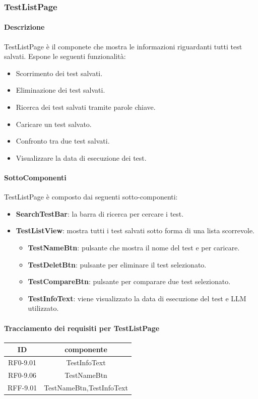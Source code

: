 \subsubsection{TestListPage}
\label{sec:TestListPage}
\paragraph{Descrizione}
TestListPage è il componete che mostra le informazioni riguardanti tutti test salvati. Espone le seguenti funzionalità:
\begin{itemize}
    \item Scorrimento dei test salvati.
    \item Eliminazione dei test salvati.
    \item Ricerca dei test salvati tramite parole chiave.
    \item Caricare un test salvato.
    \item Confronto tra due test salvati.
    \item Visualizzare la data di esecuzione dei test.
\end{itemize}

\paragraph{SottoComponenti}
TestListPage è composto dai seguenti sotto-componenti:
\begin{itemize}
    \item \textbf{SearchTestBar}: la barra di ricerca per cercare i test.
    \item \textbf{TestListView}: mostra tutti i test salvati sotto forma di una lista scorrevole.
    \begin{itemize}
        \item \textbf{TestNameBtn}: pulsante che mostra il nome del test e per caricare.
        \item \textbf{TestDeletBtn}: pulsante per eliminare il test selezionato.
        \item \textbf{TestCompareBtn}: pulsante per comparare due test selezionato.
        \item \textbf{TestInfoText}: viene visualizzato la data di esecuzione del test e LLM utilizzato.
    \end{itemize}
\end{itemize}

\paragraph{Tracciamento dei requisiti per TestListPage}
\begin{tabularx}{\textwidth}{|c|c|}
    \hline
    \textbf{ID} & \textbf{componente} \\
    \hline
        RF0-9.01 & TestInfoText\\
    \hline
        RF0-9.06 & TestNameBtn\\
    \hline
        RFF-9.01 & TestNameBtn,TestInfoText\\
    \hline
\end{tabularx}

